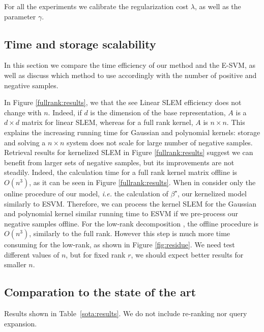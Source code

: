 For all the experiments we calibrate the regularization cost $\lambda$, as well as the parameter $\gamma$. 



\subsection{Time and storage scalability} \label{time-scale}
In this section we compare the time efficiency of our method and the E-SVM, as well as discuss which method to use accordingly with the number of positive and negative samples.

In Figure \ref{fullrank:results}, we that the see Linear SLEM efficiency does not change with $n$.
Indeed, if $d$ is the dimension of the base representation, $A$ is a $d\times d$ matrix for linear SLEM, whereas for a full rank kernel, $A$ is $n\times n$.
This explains the increasing running time for Gaussian and polynomial kernels: storage and solving a $n\times n$ system does not scale for large number of negative samples.
Retrieval results for kernelized SLEM in Figure \ref{fullrank:results} suggest we can benefit from larger sets of negative samples, but its improvements are not steadily. Indeed, the calculation time for a full rank kernel matrix offline is $O(n^3)$, as it can be seen in Figure \ref{fullrank:results}.
When in consider only the online procedure of our model, \emph{i.e.} the calculation of $\beta^\star$, our kernelized model similarly to ESVM. Therefore, we can process the kernel SLEM for the Gaussian and polynomial kernel similar running time to ESVM if we pre-process our negative samples offline.
For the low-rank decomposition , the offline procedure is $O(n^3)$, similarly to the full rank. However this step is much more time consuming for the low-rank, as shown in Figure \ref{fig:residue}. We need test different values of $n$, but for fixed rank $r$, we should expect better results for smaller $n$.    

\vspace{3 mm}



\subsection{Comparation to the state of the art}
Results shown in Table~\ref{sota:results}. We do not include re-ranking nor query expansion. 


